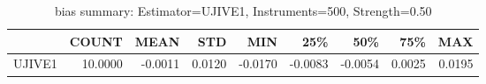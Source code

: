 \begin{table}[ht]
\centering
\caption{bias summary: Estimator=UJIVE1, Instruments=500, Strength=0.50}
\begin{tabular}{lrrrrrrrr}
\toprule
 & COUNT & MEAN & STD & MIN & 25\% & 50\% & 75\% & MAX \\
\midrule
UJIVE1 & 10.0000 & -0.0011 & 0.0120 & -0.0170 & -0.0083 & -0.0054 & 0.0025 & 0.0195 \\
\bottomrule
\end{tabular}
\end{table}
